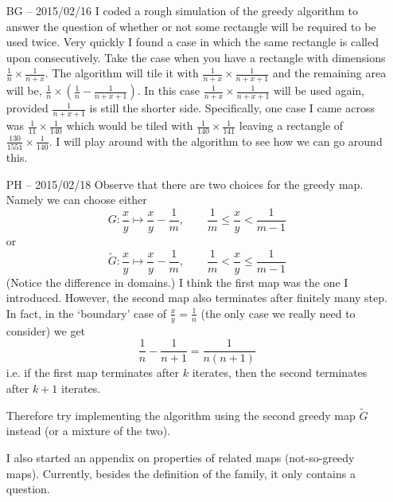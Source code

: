 \documentclass[11pt]{article}
\theoremstyle{plain}%
\theoremstyle{definition}
\theoremstyle{remark}
\numberwithin{equation}{section}
\begin{document}
\begin{itemize}
\item[BG -- 2015/02/16]
I coded a rough simulation of the greedy algorithm to answer the question of whether or not some rectangle will be required to be used twice. Very quickly I found a case in which the same rectangle is called upon consecutively. Take the case when you have a rectangle with dimensions $\frac{1}{n}\times\frac{1}{n+x}$. The algorithm will tile it with $\frac{1}{n+x}\times\frac{1}{n+x+1}$ and the remaining area will be, $\frac{1}{n}\times(\frac{1}{n}-\frac{1}{n+x+1})$. In this case $\frac{1}{n+x}\times\frac{1}{n+x+1}$ will be used again, provided $\frac{1}{n+x+1}$ is still the shorter side. Specifically, one case I came across was $\frac{1}{11}\times\frac{1}{140}$ which would be tiled with $\frac{1}{140}\times\frac{1}{141}$ leaving a rectangle of $\frac{130}{1551}\times\frac{1}{140}$. I will play around with the algorithm to see how we can go around this.
\item[PH -- 2015/02/18]
Observe that there are two choices for the greedy map. 
Namely we can choose either
\begin{equation}
G\colon\frac{x}{y}\mapsto \frac{x}{y}-\frac{1}{m}, \qquad \frac{1}{m}\leq \frac{x}{y}<\frac{1}{m-1}
\end{equation}
or
\begin{equation}
\tilde G\colon\frac{x}{y}\mapsto \frac{x}{y}-\frac{1}{m}, \qquad \frac{1}{m}< \frac{x}{y}\leq\frac{1}{m-1}
\end{equation}
(Notice the difference in domains.)
I think the first map was the one I introduced.
However, the second map also terminates after finitely many step.
In fact, in the `boundary' case of $\frac{x}{y}=\frac{1}{n}$ (the only case we really need to consider) we get
\begin{equation}
\frac{1}{n}-\frac{1}{n+1}=\frac{1}{n(n+1)}
\end{equation}
i.e. if the first map terminates after $k$ iterates, then the second terminates after $k+1$ iterates.

Therefore try implementing the algorithm using the second greedy map $\tilde G$ instead (or a mixture of the two).

I also started an appendix on properties of related maps (not-so-greedy maps). Currently, besides the definition of the family,  it only contains a question.
\end {itemize}
\end{document}
